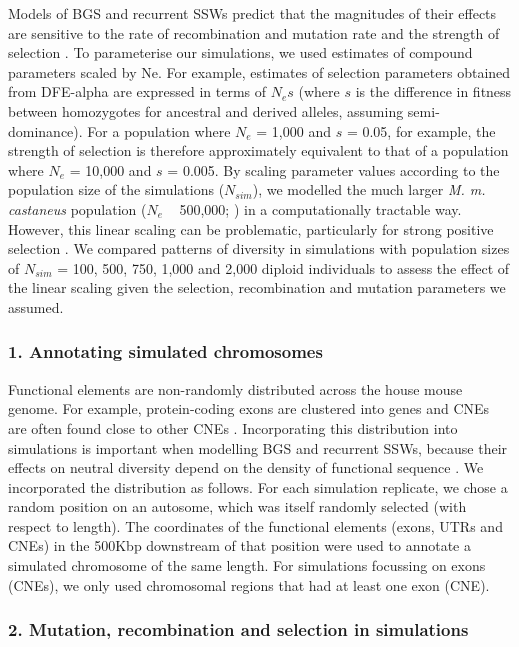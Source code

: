 Models of BGS and recurrent SSWs predict that the magnitudes of their effects are sensitive to the rate of recombination and mutation rate and the strength of selection \citep{RN277, RN157, RN226}. To parameterise our simulations, we used estimates of compound parameters scaled by Ne. For example, estimates of selection parameters obtained from DFE-alpha are expressed in terms of $N_es$ (where $s$ is the difference in fitness between homozygotes for ancestral and derived alleles, assuming semi-dominance). For a population where $N_e$ = 1,000 and $s$ = 0.05, for example, the strength of selection is therefore approximately equivalent to that of a population where $N_e$ = 10,000 and $s$ = 0.005. By scaling parameter values according to the population size of the simulations ($N_{sim}$), we modelled the much larger \textit{M. m. castaneus} population ($N_e$ ~ 500,000; \citealt{RN315}) in a computationally tractable way. However, this linear scaling can be problematic, particularly for strong positive selection \citep{RN198}. We compared patterns of diversity in simulations with population sizes of $N_{sim}$ = 100, 500, 750, 1,000 and 2,000 diploid individuals to assess the effect of the linear scaling given the selection, recombination and mutation parameters we assumed.

\subsubsection{1. Annotating simulated chromosomes}

	Functional elements are non-randomly distributed across the house mouse genome. For example, protein-coding exons are clustered into genes and CNEs are often found close to other CNEs \citep{RN122}. Incorporating this distribution into simulations is important when modelling BGS and recurrent SSWs, because their effects on neutral diversity depend on the density of functional sequence \citep{RN157,RN290}. We incorporated the distribution as follows. For each simulation replicate, we chose a random position on an autosome, which was itself randomly selected (with respect to length). The coordinates of the functional elements (exons, UTRs and CNEs) in the 500Kbp downstream of that position were used to annotate a simulated chromosome of the same length. For simulations focussing on exons (CNEs), we only used chromosomal regions that had at least one exon (CNE).

\subsubsection{2. Mutation, recombination and selection in simulations}
 
